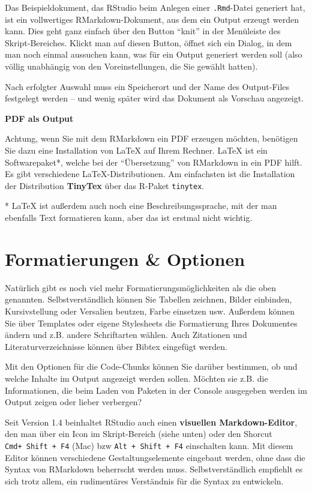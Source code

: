 \documentclass[
]{book}
\begin{document}
Das Beispieldokument, das RStudio beim Anlegen einer \texttt{.Rmd}-Datei generiert hat, ist ein vollwertiges RMarkdown-Dokument, aus dem ein Output erzeugt werden kann. Dies geht ganz einfach über den Button ``knit'' in der Menüleiste des Skript-Bereiches. Klickt man auf diesen Button, öffnet sich ein Dialog, in dem man noch einmal aussuchen kann, was für ein Output generiert werden soll (also völlig unabhängig von den Voreinstellungen, die Sie gewählt hatten).

Nach erfolgter Auswahl muss ein Speicherort und der Name des Output-Files festgelegt werden -- und wenig später wird das Dokument als Vorschau angezeigt.

\leavevmode\hypertarget{info_tinytex}{}%
\textbf{PDF als Output}

Achtung, wenn Sie mit dem RMarkdown ein PDF erzeugen möchten, benötigen Sie dazu eine Installation von LaTeX auf Ihrem Rechner. LaTeX ist ein Softwarepaket*, welche bei der ``Übersetzung'' von RMarkdown in ein PDF hilft. Es gibt verschiedene LaTeX-Distributionen. Am einfachsten ist die Installation der Distribution \textbf{TinyTex} über das R-Paket \texttt{tinytex}.

* LaTeX ist außerdem auch noch eine Beschreibungssprache, mit der man ebenfalls Text formatieren kann, aber das ist erstmal nicht wichtig.

\hypertarget{formatierungen-optionen}{%
\section{Formatierungen \& Optionen}\label{formatierungen-optionen}}

Natürlich gibt es noch viel mehr Formatierungsmöglichkeiten als die oben genannten. Selbstverständlich können Sie Tabellen zeichnen, Bilder einbinden, Kursivstellung oder Versalien beutzen, Farbe einsetzen usw. Außerdem können Sie über Templates oder eigene Stylesheets die Formatierung Ihres Dokumentes ändern und z.B. andere Schriftarten wählen. Auch Zitationen und Literaturverzeichnisse können über Bibtex eingefügt werden.

Mit den Optionen für die Code-Chunks können Sie darüber bestimmen, ob und welche Inhalte im Output angezeigt werden sollen. Möchten sie z.B. die Informationen, die beim Laden von Paketen in der Console ausgegeben werden im Output zeigen oder lieber verbergen?

Seit Version 1.4 beinhaltet RStudio auch einen \textbf{visuellen Markdown-Editor}, den man über ein Icon im Skript-Bereich (siehe unten) oder den Shorcut \texttt{Cmd+\ Shift\ +\ F4} (Mac) bzw \texttt{Alt\ +\ Shift\ +\ F4} einschalten kann. Mit diesem Editor können verschiedene Gestaltungselemente eingebaut werden, ohne dass die Syntax von RMarkdown beherrscht werden muss. Selbstverständlich empfiehlt es sich trotz allem, ein rudimentäres Verständnis für die Syntax zu entwickeln.
\end{document}
